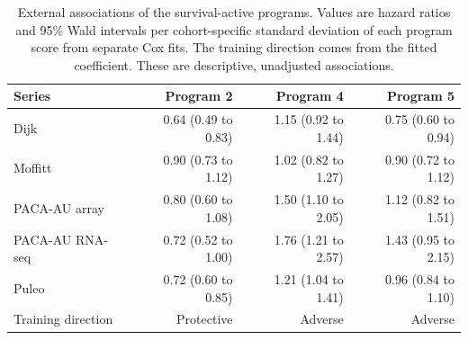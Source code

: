 \begin{table}[!htb]
\centering
\caption{External associations of the survival-active programs. Values are hazard ratios and 95\% Wald intervals per cohort-specific standard deviation of each program score from separate Cox fits. The training direction comes from the fitted coefficient. These are descriptive, unadjusted associations.}
\label{tab:external-program-direction}
\begin{tabular}{lrrr}
\toprule
Series & Program 2 & Program 4 & Program 5 \\
\midrule
Dijk & 0.64 (0.49 to 0.83) & 1.15 (0.92 to 1.44) & 0.75 (0.60 to 0.94) \\
Moffitt & 0.90 (0.73 to 1.12) & 1.02 (0.82 to 1.27) & 0.90 (0.72 to 1.12) \\
PACA-AU array & 0.80 (0.60 to 1.08) & 1.50 (1.10 to 2.05) & 1.12 (0.82 to 1.51) \\
PACA-AU RNA-seq & 0.72 (0.52 to 1.00) & 1.76 (1.21 to 2.57) & 1.43 (0.95 to 2.15) \\
Puleo & 0.72 (0.60 to 0.85) & 1.21 (1.04 to 1.41) & 0.96 (0.84 to 1.10) \\
\midrule
Training direction & Protective & Adverse & Adverse \\
\bottomrule
\end{tabular}
\end{table}
